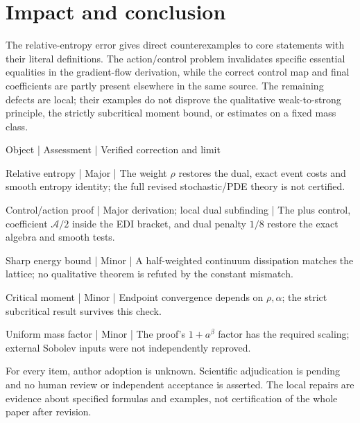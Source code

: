 \documentclass[10pt]{article}
\begin{document}
\section*{Impact and conclusion}
The relative-entropy error gives direct counterexamples to core statements with their literal definitions. The action/control problem invalidates specific essential equalities in the gradient-flow derivation, while the correct control map and final coefficients are partly present elsewhere in the same source. The remaining defects are local; their examples do not disprove the qualitative weak-to-strong principle, the strictly subcritical moment bound, or estimates on a fixed mass class.\par
Object | Assessment | Verified correction and limit\par
Relative entropy | Major | The weight \(\rho\) restores the dual, exact event costs and smooth entropy identity; the full revised stochastic/PDE theory is not certified.\par
Control/action proof | Major derivation; local dual subfinding | The plus control, coefficient \(\mathcal A/2\) inside the EDI bracket, and dual penalty \(1/8\) restore the exact algebra and smooth tests.\par
Sharp energy bound | Minor | A half-weighted continuum dissipation matches the lattice; no qualitative theorem is refuted by the constant mismatch.\par
Critical moment | Minor | Endpoint convergence depends on \(\rho,\alpha\); the strict subcritical result survives this check.\par
Uniform mass factor | Minor | The proof’s \(1+a^\beta\) factor has the required scaling; external Sobolev inputs were not independently reproved.\par
For every item, author adoption is unknown. Scientific adjudication is pending and no human review or independent acceptance is asserted. The local repairs are evidence about specified formulas and examples, not certification of the whole paper after revision.\par
\end{document}
